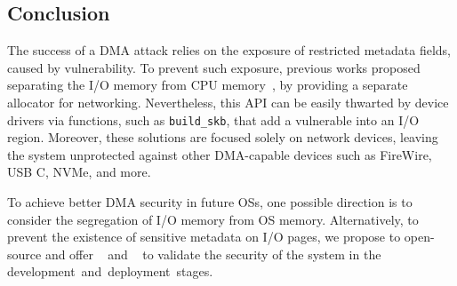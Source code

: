 \subsection{Conclusion}\label{sec:Conclusion}




The success of a DMA attack relies on the exposure of restricted metadata fields, caused by \subpage{} vulnerability. 
To prevent such exposure, previous works proposed separating the I/O memory from CPU memory~\cite{MSMT18}, by providing a separate allocator for networking. 
Nevertheless, this API can be easily thwarted by device drivers via functions, such as \texttt{build\_skb}, that add a vulnerable \shinfo into an I/O region. 
Moreover, these solutions are focused solely on network devices, leaving the system unprotected against other DMA-capable devices such as FireWire, USB C, NVMe, and more.


To achieve better DMA security in future OSs, one possible direction is to consider the segregation of I/O memory from OS memory. 
Alternatively, to prevent the existence of sensitive metadata on I/O pages, we propose to open-source and offer \tool{}~\cite{SPADE} and \dkasan{}~\cite{DKASAN} to validate the security of the system in the \mbox{development and deployment stages.} 



 




